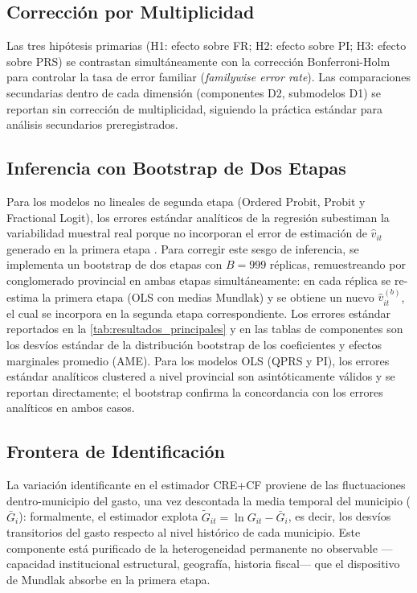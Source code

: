 \subsection{Corrección por Multiplicidad}
\label{sec:bonferroni}

Las tres hipótesis primarias (H1: efecto sobre FR; H2: efecto sobre PI; H3: efecto sobre PRS) se contrastan simultáneamente con la corrección Bonferroni-Holm para controlar la tasa de error familiar (\textit{familywise error rate}).
Las comparaciones secundarias dentro de cada dimensión (componentes D2, submodelos D1) se reportan sin corrección de multiplicidad, siguiendo la práctica estándar para análisis secundarios preregistrados.

\subsection{Inferencia con Bootstrap de Dos Etapas}
\label{sec:bootstrap}

Para los modelos no lineales de segunda etapa (Ordered Probit, Probit y Fractional Logit), los errores estándar analíticos de la regresión subestiman la variabilidad muestral real porque no incorporan el error de estimación de $\hat{v}_{it}$ generado en la primera etapa \citep{Wooldridge2015}.
Para corregir este sesgo de inferencia, se implementa un bootstrap de dos etapas con $B = 999$ réplicas, remuestreando por conglomerado provincial en ambas etapas simultáneamente: en cada réplica se re-estima la primera etapa (OLS con medias Mundlak) y se obtiene un nuevo $\hat{v}_{it}^{(b)}$, el cual se incorpora en la segunda etapa correspondiente.
Los errores estándar reportados en la \cref{tab:resultados_principales} y en las tablas de componentes son los desvíos estándar de la distribución bootstrap de los coeficientes y efectos marginales promedio (AME).
Para los modelos OLS (QPRS y PI), los errores estándar analíticos clustered a nivel provincial son asintóticamente válidos \citep{Wooldridge2015} y se reportan directamente; el bootstrap confirma la concordancia con los errores analíticos en ambos casos.

\subsection{Frontera de Identificación}
\label{sec:frontera}

La variación identificante en el estimador CRE+CF proviene de las fluctuaciones dentro-municipio del gasto, una vez descontada la media temporal del municipio ($\bar{G}_{i}$): formalmente, el estimador explota $\tilde{G}_{it} = \ln G_{it} - \bar{G}_{i}$, es decir, los desvíos transitorios del gasto respecto al nivel histórico de cada municipio.
Este componente está purificado de la heterogeneidad permanente no observable ---capacidad institucional estructural, geografía, historia fiscal--- que el dispositivo de Mundlak absorbe en la primera etapa.

